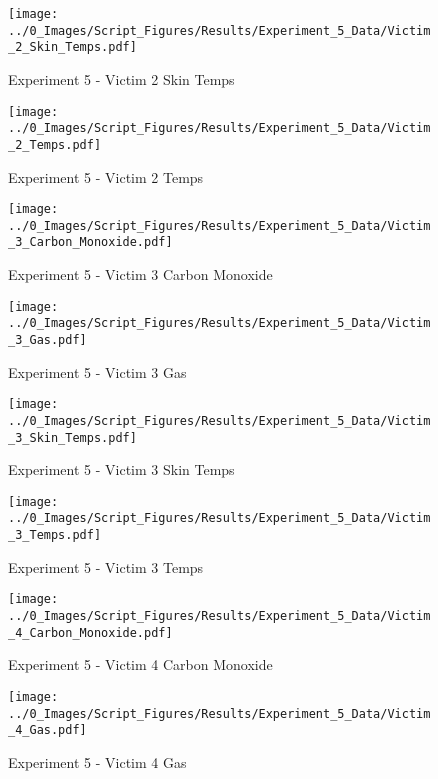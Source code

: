 	\begin{figure}[H]
		\centering
		\texttt{[image: ../0\_Images/Script\_Figures/Results/Experiment\_5\_Data/Victim\_2\_Skin\_Temps.pdf]}
		\caption[]{Experiment 5 - Victim 2 Skin Temps}
	\end{figure}
 
	\clearpage

	\begin{figure}[H]
		\centering
		\texttt{[image: ../0\_Images/Script\_Figures/Results/Experiment\_5\_Data/Victim\_2\_Temps.pdf]}
		\caption[]{Experiment 5 - Victim 2 Temps}
	\end{figure}
 

	\begin{figure}[H]
		\centering
		\texttt{[image: ../0\_Images/Script\_Figures/Results/Experiment\_5\_Data/Victim\_3\_Carbon\_Monoxide.pdf]}
		\caption[]{Experiment 5 - Victim 3 Carbon Monoxide}
	\end{figure}
 
	\clearpage

	\begin{figure}[H]
		\centering
		\texttt{[image: ../0\_Images/Script\_Figures/Results/Experiment\_5\_Data/Victim\_3\_Gas.pdf]}
		\caption[]{Experiment 5 - Victim 3 Gas}
	\end{figure}
 

	\begin{figure}[H]
		\centering
		\texttt{[image: ../0\_Images/Script\_Figures/Results/Experiment\_5\_Data/Victim\_3\_Skin\_Temps.pdf]}
		\caption[]{Experiment 5 - Victim 3 Skin Temps}
	\end{figure}
 
	\clearpage

	\begin{figure}[H]
		\centering
		\texttt{[image: ../0\_Images/Script\_Figures/Results/Experiment\_5\_Data/Victim\_3\_Temps.pdf]}
		\caption[]{Experiment 5 - Victim 3 Temps}
	\end{figure}
 

	\begin{figure}[H]
		\centering
		\texttt{[image: ../0\_Images/Script\_Figures/Results/Experiment\_5\_Data/Victim\_4\_Carbon\_Monoxide.pdf]}
		\caption[]{Experiment 5 - Victim 4 Carbon Monoxide}
	\end{figure}
 
	\clearpage

	\begin{figure}[H]
		\centering
		\texttt{[image: ../0\_Images/Script\_Figures/Results/Experiment\_5\_Data/Victim\_4\_Gas.pdf]}
		\caption[]{Experiment 5 - Victim 4 Gas}
	\end{figure}
 

